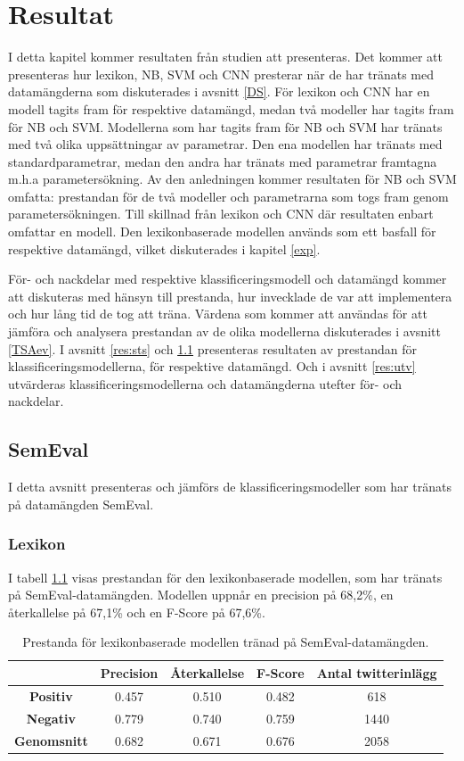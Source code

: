 \documentclass{kaumasters} %
\begin{document}
\chapter{Resultat} \label{res}
I detta kapitel kommer resultaten från studien att presenteras. Det kommer att presenteras hur lexikon, NB, SVM och CNN presterar när de har tränats med datamängderna som diskuterades i avsnitt \ref{DS}. För lexikon och CNN har en modell tagits fram för respektive datamängd, medan två modeller har tagits fram för NB och SVM. Modellerna som har tagits fram för NB och SVM har tränats med två olika uppsättningar av parametrar. Den ena modellen har tränats med standardparametrar, medan den andra har tränats med parametrar framtagna m.h.a parametersökning. Av den anledningen kommer resultaten för NB och SVM omfatta: prestandan för de två modeller och parametrarna som togs fram genom parametersökningen. Till skillnad från lexikon och CNN där resultaten enbart omfattar en modell. Den lexikonbaserade modellen används som ett basfall för respektive datamängd, vilket diskuterades i kapitel \ref{exp}.

För- och nackdelar med respektive klassificeringsmodell och datamängd kommer att diskuteras med hänsyn till prestanda, hur invecklade de var att implementera och hur lång tid de tog att träna. Värdena som kommer att användas för att jämföra och analysera prestandan av de olika modellerna diskuterades i avsnitt \ref{TSAev}. I avsnitt \ref{res:sts} och \ref{res:se} presenteras resultaten av prestandan för klassificeringsmodellerna, för respektive datamängd. Och i avsnitt \ref{res:utv} utvärderas klassificeringsmodellerna och datamängderna utefter för- och nackdelar.

\section{SemEval}\label{res:se}
I detta avsnitt presenteras och jämförs de klassificeringsmodeller som har tränats på datamängden SemEval. 
\subsection{Lexikon}
I tabell \ref{tab:lexi_se} visas prestandan för den lexikonbaserade modellen, som har tränats på SemEval-datamängden. Modellen uppnår en precision på 68,2\%, en återkallelse på 67,1\% och en F-Score på 67,6\%. 

\begin{table}[H]
\centering
\caption{Prestanda för lexikonbaserade modellen tränad på SemEval-datamängden.}
\label{tab:lexi_se}
    \begin{tabular}{ccccc}
    \toprule
     & \textbf{Precision} & \textbf{Återkallelse} & \textbf{F-Score} & \textbf{Antal twitterinlägg}  \\
    \midrule
    \textbf{Positiv} & 0.457 & 0.510 & 0.482 & 618 \\
    \textbf{Negativ} & 0.779 & 0.740 & 0.759 & 1440 \\
    \midrule
    \textbf{Genomsnitt} & 0.682 & 0.671 & 0.676  & 2058 \\
    \bottomrule
\end{tabular}
\end{table}
\end{document}
